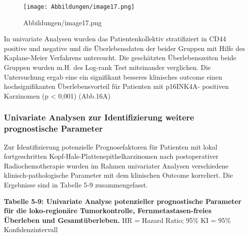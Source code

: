 \begin{fignos:no-prefix-figure-caption}

\begin{figure}
\centering
\texttt{[image: Abbildungen/image17.png]}
\caption{Abbildungen/image17.png}
\end{figure}

\end{fignos:no-prefix-figure-caption}

In univariate Analysen wurden das Patientenkollektiv stratifiziert in CD44 positive und negative und die Überlebensdaten der beider Gruppen mit Hilfe des Kaplane-Meier Verfahrens untersucht. Die geschätzten Überlebenszeiten beide Gruppen wurden m.H. des Log-rank Test miteinander verglichen. Die Untersuchung ergab eine ein signifikant besseres klinisches outcome einen hochsignifikanten Überlebensvorteil für Patienten mit p16INK4A- positiven Karzinomen (p \textless{} 0,001) (Abb.16A)

\hypertarget{univariate-analysen-zur-identifizierung-weitere-prognostische-parameter}{%
\subsubsection{Univariate Analysen zur Identifizierung weitere prognostische Parameter}\label{univariate-analysen-zur-identifizierung-weitere-prognostische-parameter}}

Zur Identifizierung potenzielle Prognosefaktoren für Patienten mit lokal fortgeschritten Kopf-Hals-Plattenepithelkarzinomen nach postoperativer Radiochemotherapie wurden im Rahmen univariater Analysen verschiedene klinisch-pathologische Parameter mit dem klinischen Outcome korreliert. Die Ergebnisse sind in Tabelle 5‑9 zusammengefasst.

\textbf{Tabelle 5‑9: Univariate Analyse potenzieller prognostische Parameter für die loko-regionäre Tumorkontrolle, Fernmetastasen-freies Überleben und Gesamtüberleben.} HR = Hazard Ratio; 95\% KI = 95\% Konfidenzintervall


